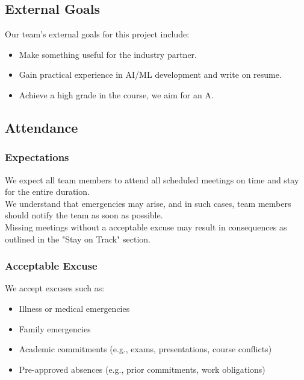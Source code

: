 \documentclass{article}
\begin{document}
\subsection*{External Goals}

Our team's external goals for this project include:
\begin{itemize}
  \item Make something useful for the industry partner.
  \item Gain practical experience in AI/ML development and write on resume.
  \item Achieve a high grade in the course, we aim for an A.
\end{itemize}

\subsection*{Attendance}

\subsubsection*{Expectations}

We expect all team members to attend all scheduled meetings on time and stay for the entire duration. \\
We understand that emergencies may arise, and in such cases, team members should notify the team as soon as possible.\\
Missing meetings without a acceptable excuse may result in consequences as outlined in the "Stay on Track" section.

\subsubsection*{Acceptable Excuse}

We accept excuses such as:
\begin{itemize}
  \item Illness or medical emergencies
  \item Family emergencies
  \item Academic commitments (e.g., exams, presentations, course conflicts)
  \item Pre-approved absences (e.g., prior commitments, work obligations)
\end{itemize}
\end{document}
